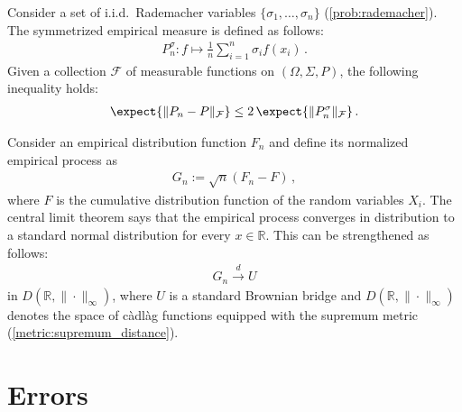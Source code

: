     \begin{property}
        Consider a set of i.i.d.~Rademacher variables $\{\sigma_1,\ldots,\sigma_n\}$ (\cref{prob:rademacher}). The symmetrized empirical measure is defined as follows:
        \begin{gather}
            P^\sigma_n:f\mapsto\frac{1}{n}\sum_{i=1}^n\sigma_if(x_i)\,.
        \end{gather}
        Given a collection $\mathcal{F}$ of measurable functions on $(\Omega,\Sigma,P)$, the following inequality holds:
        \begin{gather}
            \expect{\|P_n-P\|_{\mathcal{F}}}\leq2\,\expect{\|P^\sigma_n\|_{\mathcal{F}}}\,.
        \end{gather}
    \end{property}

    \begin{theorem}[Donsker]
        Consider an empirical distribution function $F_n$ and define its normalized empirical process as
        \begin{gather}
            G_n := \sqrt{n}(F_n-F)\,,
        \end{gather}
        where $F$ is the cumulative distribution function of the random variables $X_i$. The central limit theorem says that the empirical process converges in distribution to a standard normal distribution for every $x\in\mathbb{R}$. This can be strengthened as follows:
        \begin{gather}
            G_n\overset{d}{\longrightarrow}U
        \end{gather}
        in $D(\mathbb{R},\|\cdot\|_\infty)$, where $U$ is a standard Brownian bridge and $D(\mathbb{R},\|\cdot\|_\infty)$ denotes the space of c\`adl\`ag functions equipped with the supremum metric (\cref{metric:supremum_distance}).
    \end{theorem}

\section{Errors}


